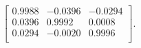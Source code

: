 \begin{equation*}
\begin{bmatrix}
  0.9988 &  -0.0396 &  -0.0294 \\
  0.0396 &   0.9992 &   0.0008 \\
  0.0294 &  -0.0020 &   0.9996 \\
\end{bmatrix}.
\end{equation*}
